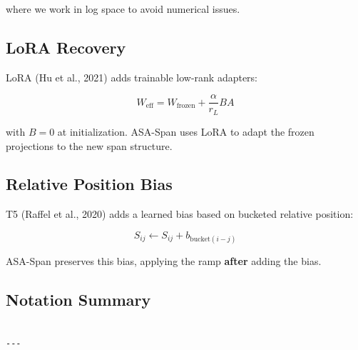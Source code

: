 where we work in log space to avoid numerical issues.

\subsection{LoRA Recovery}

LoRA (Hu et al., 2021) adds trainable low-rank adapters:

\begin{equation}
W_\text{eff} = W_\text{frozen} + \frac{\alpha}{r_L} B A
\end{equation}

with $B = 0$ at initialization. ASA-Span uses LoRA to adapt the frozen 
projections to the new span structure.

\subsection{Relative Position Bias}

T5 (Raffel et al., 2020) adds a learned bias based on bucketed relative 
position:

\begin{equation}
S_{ij} \leftarrow S_{ij} + b_{\text{bucket}(i - j)}
\end{equation}

ASA-Span preserves this bias, applying the ramp \textbf{after} adding the bias.

\subsection{Notation Summary}

\begin{lstlisting}

---
\end{lstlisting}